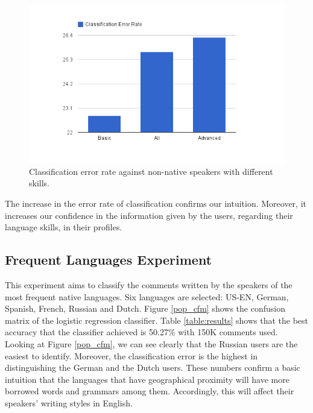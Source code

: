 \documentclass[10pt,a5paper,twoside]{article}
\begin{document}
\begin{figure}
\centering
\includegraphics[scale=0.50]{fluency.png}
\caption{Classification error rate against non-native speakers with different
skills.}
\label{fluency}
\end{figure}

The increase in the error rate of classification confirms our intuition.
Moreover, it increases our confidence in the information given by the users,
regarding their language skills, in their profiles.

\subsection{Frequent Languages Experiment}
\label{frequent}
This experiment aims to classify the comments written by the speakers of the most frequent native languages.
Six languages are selected: US-EN, German, Spanish, French, Russian and Dutch.
Figure \ref{pop_cfm} shows the confusion matrix of the logistic regression
classifier.
Table \ref{table:results} shows that the best accuracy that the classifier
achieved is 50.27\% with 150K comments used. Looking at Figure \ref{pop_cfm}, we can see clearly that the
Russian users are the easiest to identify. Moreover, the classification error is
the highest in distinguishing the German and the Dutch users. These numbers confirm a basic
intuition that the languages that have geographical proximity will have more
borrowed words and grammars among them. Accordingly, this will affect their
speakers' writing styles in English.
\end{document}
